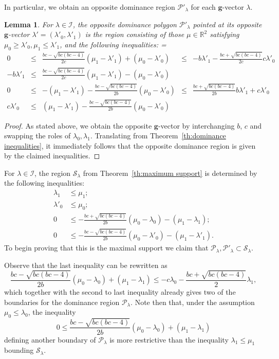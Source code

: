 \documentclass[pdflatex,sn-mathphys]{sn-jnl}%
\theoremstyle{thmstyleone}%
\newtheorem{lemma}[theorem]{Lemma}
\theoremstyle{thmstyletwo}%
\theoremstyle{thmstylethree}%
\newcommand{\bfg}{\boldsymbol{g}}
\newcommand{\cI}{\mathcal{I}}
\newcommand{\cP}{\mathcal{P}}
\newcommand{\cS}{\mathcal{S}}
\newcommand{\RR}{\mathbb{R}}
\begin{document}
  In particular, we obtain an opposite dominance region $\cP'_\lambda$ for each $\bfg$-vector $\lambda$.
  \begin{lemma}
    For $\lambda\in\cI$, the opposite dominance polygon $\cP'_\lambda$ pointed at its opposite $\bfg$-vector $\lambda'=(\lambda'_0,\lambda'_1)$ is the region consisting of those $\mu\in\RR^2$ satisfying $\mu_0 \geq \lambda'_0, \mu_1 \leq\lambda'_1$, and the following inequalities:
    {
      \everymath={\displaystyle}
      \def\arraystretch{2.8}
      \[
        \begin{array}{rcccl}
          0 & \leq & \frac{b c-\sqrt{b c (b c-4)}}{2 c}(\mu_1-\lambda'_1)+(\mu_0-\lambda'_0) & \leq & -b\lambda'_1-\frac{b c+\sqrt{b c (b c-4)}}{2c}c\lambda'_0
          \\
          -b\lambda'_1 & \leq & \frac{b c-\sqrt{b c (b c-4)}}{2 c}(\mu_1-\lambda'_1)-(\mu_0-\lambda'_0)
          \\
          0 & \leq &  -(\mu_1-\lambda'_1)-\frac{b c-\sqrt{b c (b c-4)}}{2 b}(\mu_0-\lambda'_0) & \leq & \frac{b c+\sqrt{b c (b c-4)}}{2b}b\lambda'_1+c\lambda'_0
          \\
          c \lambda'_0 & \leq & (\mu_1-\lambda'_1) - \frac{b c-\sqrt{b c (b c-4)}}{2 b} (\mu_0-\lambda'_0)
        \end{array}
      \]
    }
  \end{lemma}
  \begin{proof}
    As stated above, we obtain the opposite $\bfg$-vector by interchanging $b$, $c$ and swapping the roles of $\lambda_0,\lambda_1$.
    Translating from Theorem~\ref{th:dominance inequalities}, it immediately follows that the opposite dominance region is given by the claimed inequalities.
  \end{proof}

  For $\lambda\in\cI$, the region $\cS_\lambda$ from Theorem~\ref{th:maximum support} is determined by the following inequalities:
  \begin{align*}
    \lambda_1 &\leq \mu_1;\\
    \lambda'_0 &\leq \mu_0;\\
    0 &\leq -\frac{b c+\sqrt{b c (b c-4)}}{2 b}(\mu_0-\lambda_0)-(\mu_1-\lambda_1);\\
    0 &\leq -\frac{b c-\sqrt{b c (b c-4)}}{2 b}(\mu_0-\lambda'_0) -(\mu_1-\lambda'_1).
  \end{align*}
  To begin proving that this is the maximal support we claim that $\cP_\lambda,\cP'_\lambda\subset\cS_\lambda$.

  Observe that the last inequality can be rewritten as
  \[ \frac{b c-\sqrt{b c (b c-4)}}{2 b}(\mu_0-\lambda_0) + (\mu_1-\lambda_1) \leq -c\lambda_0 - \frac{b c + \sqrt{b c (b c-4)}}{2 } \lambda_1,\]
  which together with the second to last inequality already gives two of the boundaries for the dominance region $\cP_\lambda$.
  Note then that, under the assumption $\mu_0\leq\lambda_0$, the inequality 
  \[0 \leq \frac{b c-\sqrt{b c (b c-4)}}{2 b}(\mu_0-\lambda_0)+(\mu_1-\lambda_1)\]
  defining another boundary of $\cP_\lambda$ is more restrictive than the inequality $\lambda_1\leq\mu_1$ bounding $\cS_\lambda$.
\end{document}
